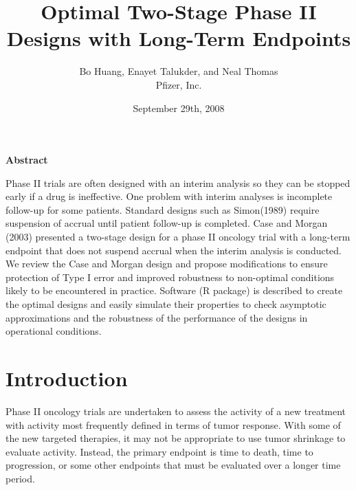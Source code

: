 \documentclass[12pt]{article}
\begin{document}
\title{\bf Optimal Two-Stage Phase II Designs with Long-Term Endpoints}
\author{Bo Huang, Enayet Talukder, and Neal Thomas\\
Pfizer, Inc.}
\date{{ September 29th, 2008}}
\maketitle

\begin{center}
{\bf Abstract}
\end{center}

Phase II trials are often designed with an interim analysis so they can be stopped early if a drug
is ineffective. One problem with interim analyses is incomplete follow-up for some patients.
Standard designs such as Simon(1989) require suspension of accrual until patient follow-up is
completed. Case and Morgan (2003) presented a two-stage design for a phase II oncology trial with a
long-term endpoint that does not suspend accrual when the interim analysis is conducted.  We review
the Case and Morgan design and propose modifications to ensure protection of Type I error and
improved robustness to non-optimal conditions likely to be encountered in practice.  Software (R
package) is described to create the optimal designs and easily simulate their properties to check
asymptotic approximations and the robustness of the performance of the designs in operational
conditions.

\newpage

\section{Introduction}
Phase II oncology trials are undertaken to  assess the activity of a new treatment with activity
most frequently defined in terms of tumor response. With some of the new targeted therapies, it may
not be appropriate to use tumor shrinkage to evaluate activity. Instead, the primary endpoint is
time to death, time to progression, or some other endpoints that must be evaluated over a longer
time period.
\end{document}
